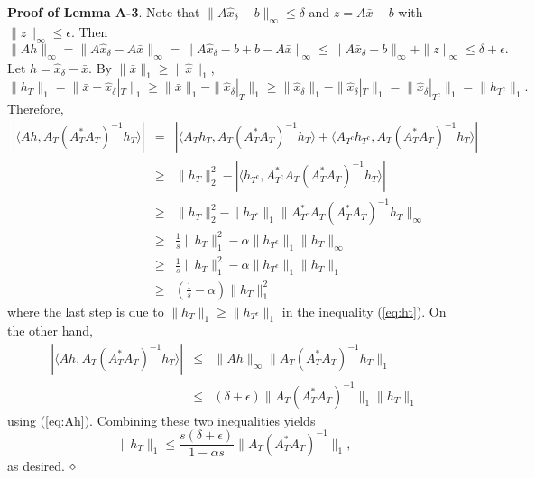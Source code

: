 \documentclass{article}
\begin{document}
\textbf{Proof of Lemma A-3}. 
Note that $\|A \hat{x}_\delta -b\|_\infty \leq \delta$ and $z=A\bar{x}-b$ with $\|z\|_\infty \leq \epsilon$. Then
\begin{equation} \label{eq:Ah} 
\|Ah\|_\infty = \|A\hat{x}_\delta - A \bar{x} \|_\infty = \|A\hat{x}_\delta - b+ b - A\bar{x}\|_\infty\leq \|A\bar{x}_\delta-b\|_\infty + \|z\|_\infty \leq \delta + \epsilon. 
\end{equation}
Let $h = \hat{x}_\delta - \bar{x}$. By $\|\bar{x}\|_1 \geq \|\hat{x}\|_1$,
\begin{equation}\label{eq:ht} 
\|h_{T}\|_1 = \|\bar{x}-\hat{x}_\delta |_T  \|_1 \geq \|\bar{x}\|_1 - \|\hat{x}_\delta|_T \|_1 \geq \|\hat{x}_\delta \|_1 - \|\hat{x}_\delta|_T \|_1 = \| \hat{x}_\delta|_{T^c} \|_1 = \|h_{T^c} \|_1 .
\end{equation}
Therefore, 
\begin{eqnarray*}
|\langle A h , A_T (A^*_T A_T)^{-1} h_T\rangle| & =  & |\langle A_T h_T , A_T(A^*_T A_T)^{-1} h _T \rangle + \langle A_{T^c} h_{T^c},A_T(A^*_T A_T)^{-1} h _T \rangle | \\
& \geq & \|h_T\|_2^2 - |\langle h_{T^c} ,    A^*_{T^c}A_T(A^*_T A_T)^{-1} h _T \rangle | \\
& \geq & \|h_T\|_2^2 - \|h_{T^c}\|_1 \|A^*_{T^c}A_T(A^*_T A_T)^{-1} h _T \|_\infty \\
& \geq & \frac{1}{s} \|h_T\|_1^2 - \alpha \|h_{T^c} \|_1 \|h_T\|_\infty \\
& \geq & \frac{1}{s} \|h_T\|_1^2 - \alpha \|h_{T^c}\|_1 \|h_T\|_1 \\
& \geq & \left( \frac{1}{s} - \alpha \right) \|h_T\|_1^2
\end{eqnarray*}
where the last step is due to $\|h_T\|_1 \geq \|h_{T^c} \|_1$ in the inequality (\ref{eq:ht}). On the other hand,
\begin{eqnarray*}
|\langle A h , A_T (A^*_T A_T)^{-1} h_T\rangle| & \leq  & \|A h\|_\infty \|A_T(A^*_T A_T)^{-1} h_T \|_1  \\
& \leq &  (\delta +\epsilon) \|A_T(A^*_T A_T)^{-1} \|_1 \|h_T\|_1
\end{eqnarray*} 
using (\ref{eq:Ah}). Combining these two inequalities yields
\[   \|h_T\|_1 \leq \frac{s(\delta+\epsilon)}{1-\alpha s} \|A_T(A^*_T A_T)^{-1} \|_1, \]
as desired. 
$\hfill\diamond$
\end{document}
